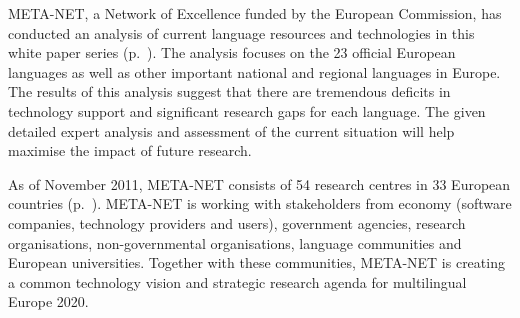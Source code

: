\begin{Parallel}[c]{78mm}{78mm}
{%
META-NET, a Network of Excellence funded by the European Commission, has conducted an  analysis of current language resources and technologies in this white paper series (p.~\pageref{whitepaperseries}). The analysis focuses on the 23 official European languages as well as other important national and regional languages in Europe. The results of this analysis suggest that there are tremendous deficits in technology support and significant research gaps for each language. The given detailed expert analysis and assessment of the current situation will help maximise the impact of future research.

As of November 2011, META-NET consists of 54 research centres in 33 European countries (p.~\pageref{metanetmembers}). META-NET is working with stakeholders from economy (software companies, technology providers and users), government agencies, research organisations, non-governmental organisations, language communities and European universities. Together with these communities, META-NET is creating a common technology vision and strategic research agenda for multilingual Europe 2020.} 
\ParallelPar
\end{Parallel}

\makefundingnotice

\cleardoublepage

\tableofcontents



